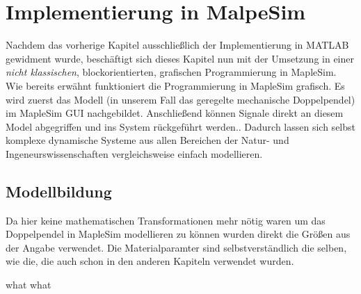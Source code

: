 \documentclass[a4paper, 10pt]{report}
\begin{document}
\renewcommand{\thechapter}{}
\chapter{Implementierung in MalpeSim}
\renewcommand{\thechapter}{4}
Nachdem das vorherige Kapitel ausschließlich der Implementierung in MATLAB gewidment wurde, beschäftigt sich dieses Kapitel nun mit der Umsetzung in einer \textit{nicht klassischen}, blockorientierten, grafischen Programmierung in MapleSim. \\
Wie bereits erwähnt funktioniert die Programmierung in MapleSim grafisch. Es wird zuerst das Modell (in unserem Fall das geregelte mechanische Doppelpendel) im MapleSim GUI nachgebildet. Anschließend können Signale direkt an diesem Model abgegriffen und ins System rückgeführt werden.. Dadurch lassen sich selbst komplexe dynamische Systeme aus allen Bereichen der Natur- und Ingeneurswissenschaften vergleichsweise einfach modellieren.
\section{Modellbildung}
Da hier keine mathematischen Transformationen mehr nötig waren um das Doppelpendel in MapleSim modellieren zu können wurden direkt die Größen aus der Angabe verwendet. Die Materialparamter sind selbstverständlich die selben, wie die, die auch schon in den anderen Kapiteln verwendet wurden.

what what
\end{document}
